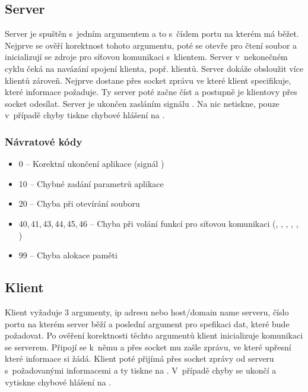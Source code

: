 \documentclass[11pt, a4paper, titlepage]{article}
\begin{document}
	\subsection{Server}
	Server je spuštěn s~jedním argumentem a to s~číslem portu na kterém má běžet. Nejprve se ověří korektnost tohoto argumentu, poté se otevře pro čtení soubor  a inicializují se zdroje pro síťovou komunikaci s~klientem. Server v~nekonečném cyklu čeká na navázání spojení klienta, popř. klientů. Server dokáže obsloužit více klientů zároveň. Nejprve dostane přes socket zprávu ve které klient specifikuje, které informace požaduje. Ty server poté začne číst a postupně je klientovy přes socket odesílat. Server je ukončen zasláním signálu . Na  nic netiskne, pouze v~případě chyby tiskne chybové hlášení na .
		\subsubsection{Návratové kódy}
		\begin{itemize}
			\item  0 -- Korektní ukončení aplikace (signál )
			\item 10 -- Chybné zadání parametrů aplikace
			\item 20 -- Chyba při otevírání souboru 
			\item 40,\,41,\,43,\,44,\,45,\,46 -- Chyba při volání funkcí pro síťovou komunikaci (, , , , , )
			\item 99 -- Chyba alokace paměti
		\end{itemize}

	\subsection{Klient}
	Klient vyžaduje 3 argumenty, ip adresu nebo host/domain name serveru, číslo portu na kterém server běží a poslední argument pro spefikaci dat, které bude požadovat. Po ověření korektnosti těchto argumentů klient inicializuje komunikaci se serverem. Připojí se k~němu a přes socket mu zašle zprávu, ve které upřesní které informace si žádá. Klient poté přijímá přes socket zprávy od serveru s~požadovanými informacemi a ty tiskne na . V~případě chyby se ukončí a vytiskne chybové hlášení na .
\end{document}
